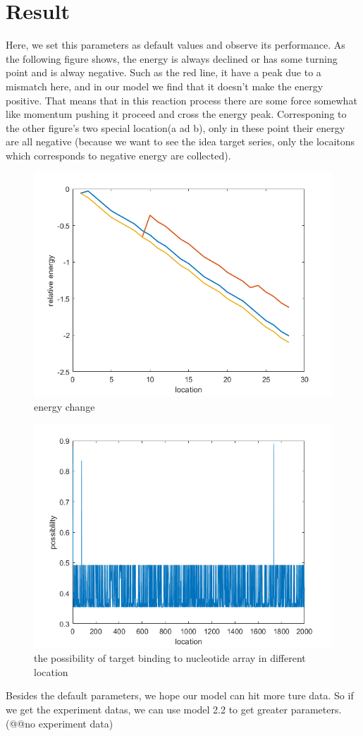 \documentclass[a4paper,10pt]{article}
\begin{document}
	\section{Result}
	Here, we set this parameters as default values and observe its performance. As the following figure shows, the energy is always declined or has some turning point and is alway negative. Such as the red line, it have a peak due to a mismatch here, and in our model we find that it doesn't make the energy positive. That means that in this reaction process there are some force somewhat like momentum pushing it proceed and cross the energy peak. Corresponing to the other figure's two special location(a ad b), only in these point their energy are all negative (because we want to see the idea target series, only the locaitons which corresponds to negative energy are collected).\par
\begin{figure}[h]
	\centering
	\includegraphics[width=0.7\linewidth]{energy_change}
	\caption{energy change}
	\label{fig:energychange}
\end{figure}
\begin{figure}[h]
	\centering
	\includegraphics[width=0.7\linewidth]{fig1}
	\caption{the possibility of target binding to nucleotide array in different location}
	\label{fig:fig1}
\end{figure}
Besides the default parameters, we hope our model can hit more ture data. So if we get the experiment datas, we can use model 2.2 to get greater parameters.(@@no experiment data) 
	

\end{document}
